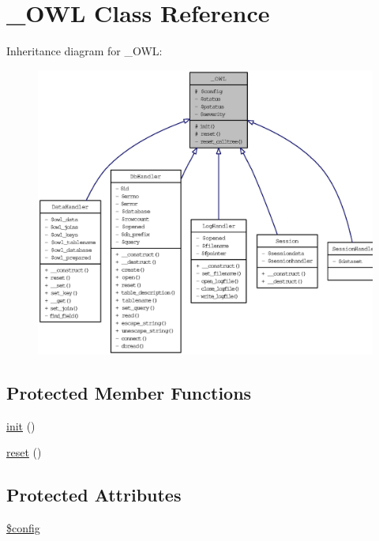 \hypertarget{class__OWL}{
\section{\_\-OWL Class Reference}
\label{class__OWL}
}
Inheritance diagram for \_\-OWL:\nopagebreak
\begin{figure}[H]
\begin{center}
\leavevmode
\includegraphics[width=400pt]{class__OWL__inherit__graph}
\end{center}
\end{figure}
\subsection*{Protected Member Functions}
\begin{CompactItemize}
\item 
\hyperlink{class__OWL_e0ef3ded56e8a6b34b6461e5a721cd3e}{init} ()
\item 
\hyperlink{class__OWL_2f2a042bcf31965194c03033df0edc9b}{reset} ()
\end{CompactItemize}
\subsection*{Protected Attributes}
\begin{CompactItemize}
\item 
\hyperlink{class__OWL_f37a011667dda12fc417a68a6f3077d1}{\$config}
\end{CompactItemize}

